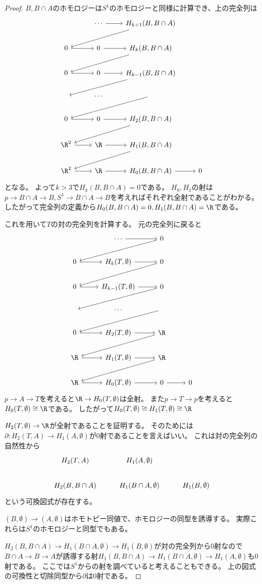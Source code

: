 \documentclass{jsarticle}
\begin{document}
\begin{proof}
$B, B\cap A$のホモロジーは$S^1$のホモロジーと同様に計算でき、上の完全列は
\[
\begin{tikzcd}
~ &\cdots \ar[r] &H_{k+1}(B,B\cap A) \ar[dll]\\
0 \ar[r] &0 \ar[r] &H_k(B,B\cap A) \ar[dll]\\
0 \ar[r] &0 \ar[r] &H_{k-1}(B,B\cap A) \ar[dll]\\
~&\cdots&\ar[dll]\\
0 \ar[r] &0 \ar[r] &H_{2}(B,B\cap A) \ar[dll]\\
\R^2 \ar[r] &\R \ar[r] &H_{1}(B,B\cap A) \ar[dll]\\
\R^2 \ar[r] &\R \ar[r] &H_{0}(B,B\cap A) \ar[r]&0
\end{tikzcd}
\]
となる。
よって$k>3$で$H_k(B,B\cap A)=0$である。
$H_0, H_1$の射は$p\to B\cap A\to B, S^1\to B\cap A\to B$を考えればそれぞれ全射であることがわかる。
したがって完全列の定義から$H_0(B,B\cap A)=0, H_1(B,B\cap A)=\R$である。

これを用いて$T$の対の完全列を計算する。
元の完全列に戻ると
\[
\begin{tikzcd}
~ &\cdots \ar[r] &0 \ar[dll]\\
0 \ar[r] &H_k(T,\emptyset) \ar[r] &0 \ar[dll]\\
0 \ar[r] &H_{k-1}(T,\emptyset) \ar[r] &0 \ar[dll]\\
~&\cdots&\ar[dll]\\
0 \ar[r] &H_{2}(T,\emptyset) \ar[r] &\R \ar[dll]\\
\R \ar[r] &H_{1}(T,\emptyset) \ar[r] &\R \ar[dll]\\
\R \ar[r] &H_{0}(T,\emptyset) \ar[r] &0 \ar[r]&0
\end{tikzcd}
\]
$p\to A\to T$を考えると$\R\to H_0(T,\emptyset)$は全射。
また$p\to T\to p$を考えると$H_0(T,\emptyset)\cong\R$である。
したがって$H_0(T,\emptyset)\cong H_1(T,\emptyset)\cong\R$

$H_2(T,\emptyset)\to \R$が全射であることを証明する。
そのためには$\partial\colon H_2(T,A)\to H_1(A,\emptyset)$が$0$射であることを言えばいい。
これは対の完全列の自然性から
\[
\begin{tikzcd}
H_2(T,A)& H_1(A,\emptyset)\\
H_2(B,B\cap A) & H_1(B\cap A,\emptyset) &H_1(B,\emptyset)
\end{tikzcd}
\]
という可換図式が存在する。

$(B,\emptyset)\to (A,\emptyset)$はホモトピー同値で、ホモロジーの同型を誘導する。
実際これらは$S^1$のホモロジーと同型でもある。

$H_2(B,B\cap A)\to H_1(B\cap A,\emptyset)\to H_1(B,\emptyset)$が対の完全列から$0$射なので
$B\cap A\to B\to A$が誘導する射$H_1(B,B\cap A)\to H_1(B\cap A,\emptyset)\to H_1(A,\emptyset)$も$0$射である。
ここでは$S^1$からの射を調べていると考えることもできる。
上の図式の可換性と切除同型から$\partial$は$0$射である。
\end{proof}
\end{document}
